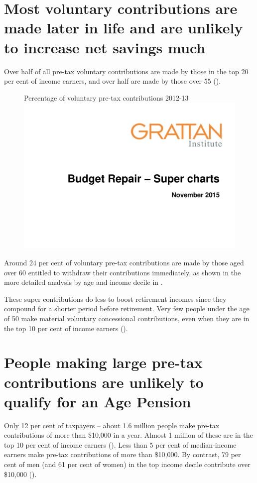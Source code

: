\documentclass{grattanAlpha}
\begin{document}
\section{Most voluntary contributions are made later in life and are unlikely to increase net savings much\label{sec:SUPER-4-3}}
Over half of all pre-tax voluntary contributions are made by those in the top 20 per cent of income earners, and over half are made by those over 55 (). 
\begin{figure}
%
{Percentage of voluntary pre-tax contributions 2012-13}\label{fig:SUPER-4-5}
\includegraphics[width=\columnwidth,page=23]{super-atlas/PPTX.pdf}

\end{figure}

Around 24 per cent of voluntary pre-tax contributions are made by those aged over 60 entitled to withdraw their contributions immediately, as shown in the more detailed analysis by age and income decile in .

These super contributions do less to boost retirement incomes since they compound for a shorter period before retirement. Very few people under the age of 50 make material voluntary concessional contributions, even when they are in the top 10 per cent of income earners ().

\section{People making large pre-tax contributions are unlikely to qualify for an Age Pension}
Only 12 per cent of taxpayers – about 1.6 million people make pre-tax contributions of more than \$10,000 in a year. Almost 1 million of these are in the top 10 per cent of income earners (). Less than 5 per cent of median-income earners make pre-tax contributions of more than \$10,000. By contrast, 79 per cent of men (and 61 per cent of women) in the top income decile contribute over \$10,000 (). 
\end{document}
